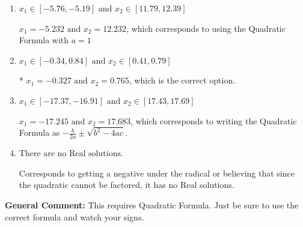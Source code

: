 \documentclass{extbook}[14pt]
\begin{document}
\begin{enumerate}
{\begin{enumerate}[label=\Alph*.]
 $x_1 = -0.765 \text{ and } x_2 = 0.327$, which corresponds to writing the Quadratic Formula as $\frac{b \pm \sqrt{b^2 - 4ac}}{2a}$
\item \( x_1 \in [-5.76, -5.19] \text{ and } x_2 \in [11.79, 12.39] \)

 $x_1 = -5.232 \text{ and } x_2 = 12.232$, which corresponds to using the Quadratic Formula with $a=1$
\item \( x_1 \in [-0.34, 0.84] \text{ and } x_2 \in [0.41, 0.79] \)

* $x_1 = -0.327 \text{ and } x_2 = 0.765$, which is the correct option.
\item \( x_1 \in [-17.37, -16.91] \text{ and } x_2 \in [17.43, 17.69] \)

 $x_1 = -17.245 \text{ and } x_2 = 17.683$, which corresponds to writing the Quadratic Formula as $-\frac{b}{2a} \pm \sqrt{b^2 - 4ac}$.
\item \( \text{There are no Real solutions.} \)

Corresponds to getting a negative under the radical or believing that since the quadratic cannot be factored, it has no Real solutions.
\end{enumerate}

\textbf{General Comment:} This requires Quadratic Formula. Just be sure to use the correct formula and watch your signs.
}
\end{enumerate}
\end{document}
